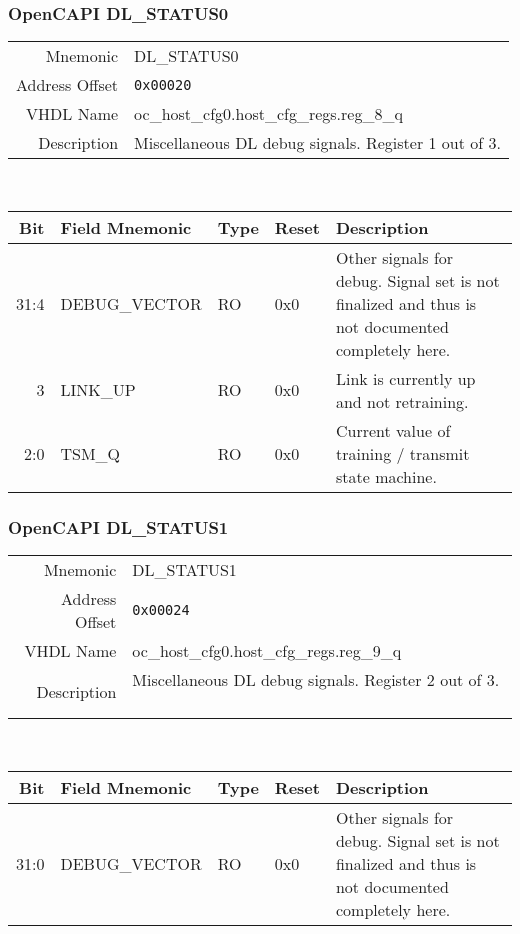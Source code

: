 \subsubsection{OpenCAPI DL\_STATUS0}
\begin{tabular}{ r | p{350px} }
  Mnemonic       & DL\_STATUS0                              \\
  Address Offset & \texttt{0x00020}                         \\
  VHDL Name      & oc\_host\_cfg0.host\_cfg\_regs.reg\_8\_q \\ \hline

  Description &
  Miscellaneous DL debug signals. Register 1 out of 3. \\

\end{tabular}
\\
\begin{tabularx}{\textwidth}{r|l|l|l|X}
  \hline
  Bit  & Field Mnemonic & Type & Reset & Description \\ \hline

  31:4 & DEBUG\_VECTOR  & RO   & 0x0   & Other signals for debug. Signal set is not finalized and thus is not documented completely here. \\
  3    & LINK\_UP       & RO   & 0x0   & Link is currently up and not retraining.            \\
  2:0  & TSM\_Q         & RO   & 0x0   & Current value of training / transmit state machine. \\
\end{tabularx}

\subsubsection{OpenCAPI DL\_STATUS1}
\begin{tabular}{ r | p{350px} }
  Mnemonic       & DL\_STATUS1                              \\
  Address Offset & \texttt{0x00024}                         \\
  VHDL Name      & oc\_host\_cfg0.host\_cfg\_regs.reg\_9\_q \\ \hline

  Description &
  Miscellaneous DL debug signals. Register 2 out of 3. \

\end{tabular}
\\
\begin{tabularx}{\textwidth}{r|l|l|l|X}
  \hline
  Bit  & Field Mnemonic & Type & Reset & Description \\ \hline

  31:0 & DEBUG\_VECTOR  & RO   & 0x0   & Other signals for debug. Signal set is not finalized and thus is not documented completely here. \\
\end{tabularx}

